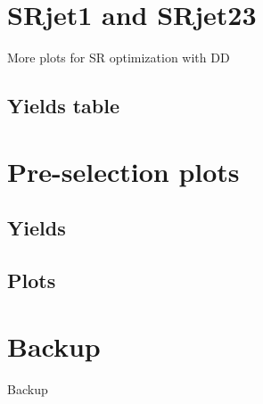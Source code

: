 \documentclass[mathserif,serif]{beamer}
\begin{document}

\section{SRjet1 and SRjet23}
\begin{frame}
\begin{center}
\huge
More plots for SR optimization with DD
\end{center}
\end{frame}




\subsection{Yields table}



\section{Pre-selection plots}
\subsection{Yields}

\subsection{Plots}


\section*{Backup}
\begin{frame}
\begin{center}
\huge
Backup
\end{center}
\end{frame}
\end{document}
